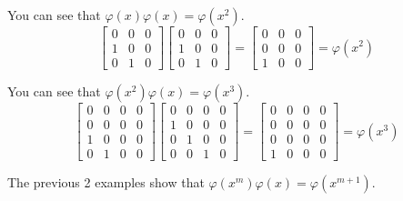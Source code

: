 \begin{example}{}
You can see that $\varphi(x)\varphi(x) = \varphi(x^2)$.
\[\left[\begin{array}{ccc}0 & 0 & 0 \\1 & 0 & 0 \\0 & 1 & 0 \end{array}\right] \left[\begin{array}{ccc}0 & 0 & 0 \\1 & 0 & 0 \\0 & 1 & 0 \end{array}\right]
=\left[\begin{array}{ccc}0 & 0 & 0 \\0 & 0 & 0 \\1 & 0 & 0 \end{array}\right]
= \varphi(x^2)\]
\end{example}

\begin{example}{}
You can see that $\varphi(x^2)\varphi(x) = \varphi(x^3)$.
\[\left[\begin{array}{cccc}0 & 0 & 0 & 0 \\0 & 0 & 0 & 0 \\1 & 0 & 0 & 0\\ 0 & 1 & 0 & 0 \end{array}\right] \left[\begin{array}{cccc}0 & 0 & 0 & 0 \\1 & 0 & 0 & 0 \\0 & 1 & 0 & 0\\0 & 0 & 1 & 0 \end{array}\right]
= \left[\begin{array}{cccc}0 & 0 & 0 & 0 \\0 & 0 & 0 & 0 \\0 & 0 & 0 & 0\\1 & 0 & 0 & 0 \end{array}\right]
= \varphi(x^3)\]
\end{example}
The previous 2 examples show that $\varphi(x^m) \varphi(x) = \varphi(x^{m+1})$.

